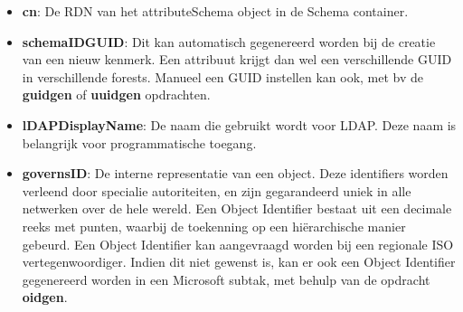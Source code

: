 \documentclass{report}
\begin{document}
\begin{enumerate}
		 { 
			\begin{itemize}
				\item \textbf{cn}: De RDN van het attributeSchema object in de Schema container.
				\item \textbf{schemaIDGUID}: Dit kan automatisch gegenereerd worden bij de creatie van een nieuw kenmerk. Een attribuut krijgt dan wel een verschillende GUID in verschillende forests. Manueel een GUID instellen kan ook, met bv de \textbf{guidgen} of \textbf{uuidgen} opdrachten.
				\item \textbf{lDAPDisplayName}: De naam die gebruikt wordt voor LDAP. Deze naam is belangrijk voor programmatische toegang.
				\item \textbf{governsID}: De interne representatie van een object. Deze identifiers worden verleend door specialie autoriteiten, en zijn gegarandeerd uniek in alle netwerken over de hele wereld. Een Object Identifier bestaat uit een decimale reeks met punten, waarbij de toekenning op een hiërarchische manier gebeurd. Een Object Identifier kan aangevraagd worden bij een regionale ISO vertegenwoordiger. Indien dit niet gewenst is, kan er ook een Object Identifier gegenereerd worden in een Microsoft subtak, met behulp van de opdracht \textbf{oidgen}.
			\end{itemize}
		}
		

\end{enumerate}
\end{document}
